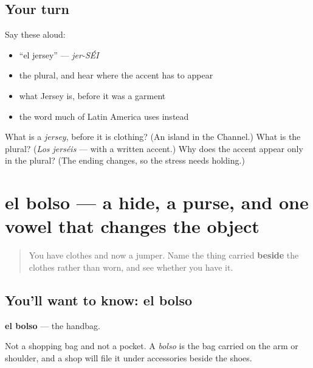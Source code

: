 \subsection*{Your turn}
Say these aloud:

\begin{itemize}
\raggedright
  \item \textquotedblleft{}el jersey\textquotedblright{} — \emph{jer-SÉI}
  \item the plural, and hear where the accent has to appear
  \item what Jersey is, before it was a garment
  \item the word much of Latin America uses instead
\end{itemize}

\begin{tcolorbox}[breakable,colback=teal!4,colframe=teal!35!black,title={Before you move on}]
What is a \emph{jersey}, before it is clothing? (An island in the Channel.) What is the plural? (\emph{Los jerséis} — with a written accent.) Why does the accent appear only in the plural? (The ending changes, so the stress needs holding.)
\end{tcolorbox}
\section[el bolso]{el bolso — a hide, a purse, and one vowel that changes the object}

\label{lesson:ES-C430-bolso}



\begin{quote}
You have clothes and now a jumper. Name the thing carried \textbf{beside} the clothes rather than worn, and see whether you have it.
\end{quote}

\subsection*{You'll want to know: el bolso}
\textbf{el bolso} — the handbag.

Not a shopping bag and not a pocket. A \emph{bolso} is the bag carried on the arm or shoulder, and a shop will file it under accessories beside the shoes.

